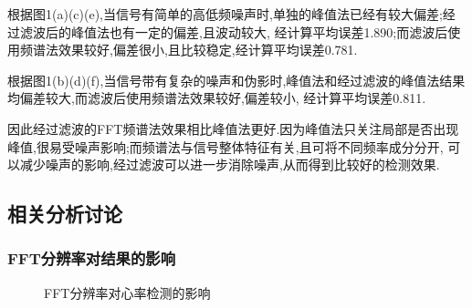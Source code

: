 \documentclass[12pt, a4paper, oneside]{ctexart}
\begin{document}
      根据图1(a)(c)(e),当信号有简单的高低频噪声时,单独的峰值法已经有较大偏差;经过滤波后的峰值法也有一定的偏差,且波动较大,
      经计算平均误差1.890;而滤波后使用频谱法效果较好,偏差很小,且比较稳定,经计算平均误差0.781.

      根据图1(b)(d)(f),当信号带有复杂的噪声和伪影时,峰值法和经过滤波的峰值法结果均偏差较大,而滤波后使用频谱法效果较好,偏差较小,
      经计算平均误差0.811.

      因此经过滤波的FFT频谱法效果相比峰值法更好.因为峰值法只关注局部是否出现峰值,很易受噪声影响;而频谱法与信号整体特征有关,且可将不同频率成分分开,
      可以减少噪声的影响,经过滤波可以进一步消除噪声,从而得到比较好的检测效果.
      \subsection{相关分析讨论}
      \subsubsection{FFT分辨率对结果的影响}
      
      \begin{figure}[H]
        \centering
        \caption{FFT分辨率对心率检测的影响}
        \label{fig:twopicture} 

      \end{figure}
\end{document}
